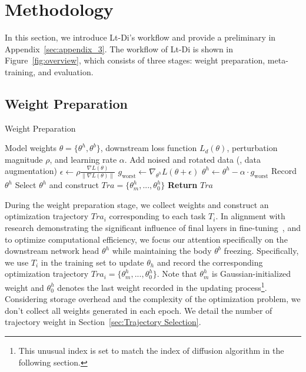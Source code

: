 \section{Methodology}\label{sec:method}
In this section, we introduce Lt-Di's workflow and provide a preliminary in Appendix~\ref{sec:appendix_3}. The workflow of Lt-Di is shown in Figure~\ref{fig:overview}, which consists of three stages: weight preparation, meta-training, and evaluation.
\\
\par
\subsection{Weight Preparation}\label{sec:weight preparation}
\begin{algorithm}[t] %
\caption{Weight Preparation}
\label{alg:SAM}
\begin{algorithmic}[1]
    \REQUIRE Model weights $\theta=\{\theta^h,\theta^b\}$, downstream loss function $L_d(\theta)$, perturbation magnitude $\rho$, and learning rate $\alpha$.
        \STATE Add noised and rotated data (\ie, data augmentation)
        \STATE $\epsilon \gets \rho \frac{\nabla L(\theta)}{\|\nabla L(\theta)\|}$
        \STATE $g_{\text{worst}} \gets \nabla_{\theta^h} L(\theta + \epsilon)$ 
        \STATE $\theta^h \gets \theta^h - \alpha \cdot g_{\text{worst}}$
        \STATE Record $\theta^h$
    \ENDFOR
    \STATE Select $\theta^h$ and construct $Tra=\{\theta^h_m,...,\theta^h_0\}$
    \STATE \textbf{Return} $Tra$
\end{algorithmic}
\end{algorithm}

During the weight preparation stage, we collect weights and construct an optimization trajectory $Tra_i$ corresponding to each task $T_i$. In alignment with research demonstrating the significant influence of final layers in fine-tuning~\cite{ANIL, SVCCA}, and to optimize computational efficiency, we focus our attention specifically on the downstream network head $\theta^h$ while maintaining the body $\theta^b$ freezing. Specifically, we use $T_i$ in the training set to update $\theta_h$ and record the corresponding optimization trajectory $Tra_i=\{\theta^h_m, ... ,\theta^h_0\}$. Note that $\theta^h_m$ is Gaussian-initialized weight and $\theta^h_0$ denotes the last weight recorded in the updating process\footnote{This unusual index is set to match the index of diffusion algorithm in the following section.}. Considering storage overhead and the complexity of the optimization problem, we don't collect all weights generated in each epoch. We detail the number of trajectory weight in Section~\ref{sec:Trajectory Selection}.


